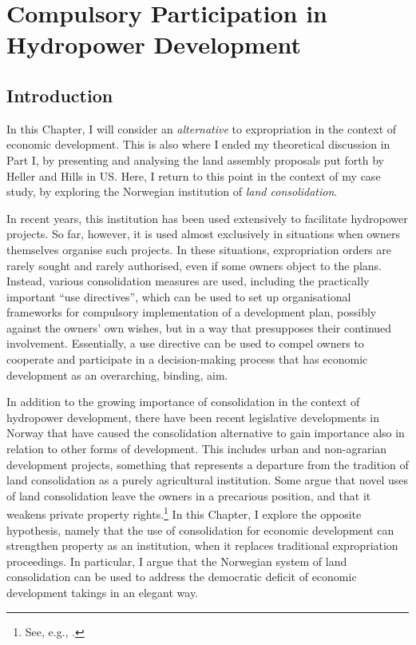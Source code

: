 \chapter{Compulsory Participation in Hydropower Development}\label{chap:6}

\section{Introduction}\label{sec:intro6}

In this Chapter, I will consider an {\it alternative} to expropriation in the context of economic development. This is also where I ended my theoretical discussion in Part I, by presenting and analysing the land assembly proposals put forth by Heller and Hills in US. Here, I return to this point in the context of my case study, by exploring the Norwegian institution of {\it land consolidation}. 

In recent years, this institution has been used extensively to facilitate hydropower projects. So far, however, it is used almost exclusively in situations when owners themselves organise such projects. In these situations, expropriation orders are rarely sought and rarely authorised, even if some owners object to the plans. Instead, various consolidation measures are used, including the practically important ``use directives'', which can be used to set up organisational frameworks for compulsory implementation of a development plan, possibly against the owners' own wishes, but in a way that presupposes their continued involvement. Essentially, a use directive can be used to compel owners to cooperate and participate in a decision-making process that has economic development as an overarching, binding, aim.

In addition to the growing importance of consolidation in the context of hydropower development, there have been recent legislative developments in Norway that have caused the consolidation alternative to gain importance also in relation to other forms of development. This includes urban and non-agrarian development projects, something that represents a departure from the tradition of land consolidation as a purely agricultural institution. Some argue that novel uses of land consolidation leave the owners in a precarious position, and that it weakens private property rights.\footnote{See, e.g., \cite{stenseth07}.} In this Chapter, I explore the opposite hypothesis, namely that the use of consolidation for economic development can strengthen property as an institution, when it replaces traditional expropriation proceedings. In particular, I argue that the Norwegian system of land consolidation can be used to address the democratic deficit of economic development takings in an elegant way.  

